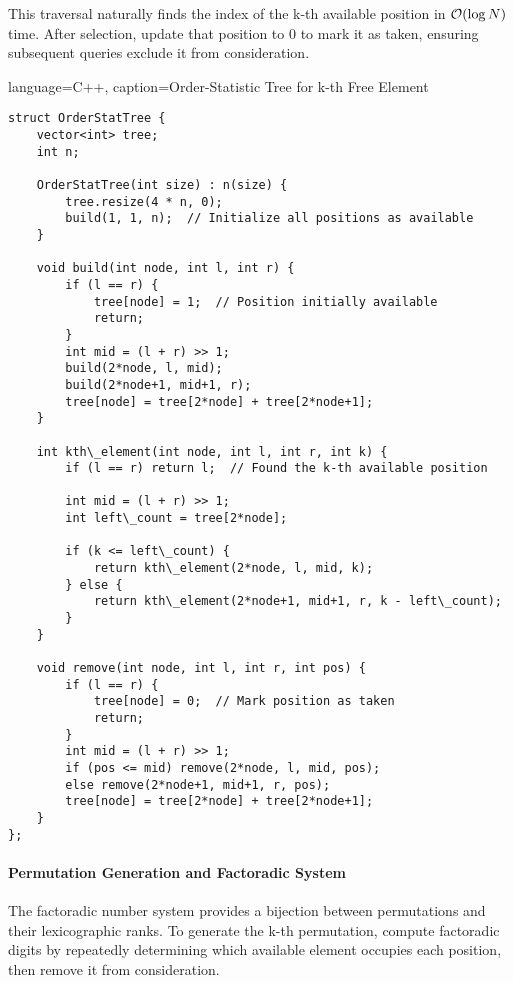 This traversal naturally finds the index of the k-th available position in $\mathcal{O}(\log N)$ time. After selection, update that position to $0$ to mark it as taken, ensuring subsequent queries exclude it from consideration.

\begin{marginlisting}[0pt]{language=C++, caption=Order-Statistic Tree for k-th Free Element}
\begin{lstlisting}
struct OrderStatTree {
    vector<int> tree;
    int n;
    
    OrderStatTree(int size) : n(size) {
        tree.resize(4 * n, 0);
        build(1, 1, n);  // Initialize all positions as available
    }
    
    void build(int node, int l, int r) {
        if (l == r) {
            tree[node] = 1;  // Position initially available
            return;
        }
        int mid = (l + r) >> 1;
        build(2*node, l, mid);
        build(2*node+1, mid+1, r);
        tree[node] = tree[2*node] + tree[2*node+1];
    }
    
    int kth\_element(int node, int l, int r, int k) {
        if (l == r) return l;  // Found the k-th available position
        
        int mid = (l + r) >> 1;
        int left\_count = tree[2*node];
        
        if (k <= left\_count) {
            return kth\_element(2*node, l, mid, k);
        } else {
            return kth\_element(2*node+1, mid+1, r, k - left\_count);
        }
    }
    
    void remove(int node, int l, int r, int pos) {
        if (l == r) {
            tree[node] = 0;  // Mark position as taken
            return;
        }
        int mid = (l + r) >> 1;
        if (pos <= mid) remove(2*node, l, mid, pos);
        else remove(2*node+1, mid+1, r, pos);
        tree[node] = tree[2*node] + tree[2*node+1];
    }
};
\end{lstlisting}
\end{marginlisting}

\paragraph{Permutation Generation and Factoradic System}

The factoradic number system provides a bijection between permutations and their lexicographic ranks. To generate the k-th permutation, compute factoradic digits by repeatedly determining which available element occupies each position, then remove it from consideration.

